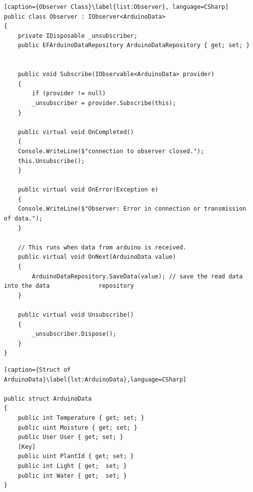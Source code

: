 \documentclass[a4paper,12pt,twoside,openright,titlepage]{book}
\begin{document}
\begin{lstlisting}[caption={Observer Class}\label{list:Observer}, language=CSharp]
public class Observer : IObserver<ArduinoData>
{
	private IDisposable _unsubscriber;
    public EFArduinoDataRepository ArduinoDataRepository { get; set; }

      
	public void Subscribe(IObservable<ArduinoData> provider)
    {
		if (provider != null)
        _unsubscriber = provider.Subscribe(this);
	}

	public virtual void OnCompleted()
	{
	Console.WriteLine($"connection to observer closed.");
	this.Unsubscribe();
	}

	public virtual void OnError(Exception e)
	{
	Console.WriteLine($"Observer: Error in connection or transmission of data.");
	}

	// This runs when data from arduino is received.
	public virtual void OnNext(ArduinoData value)
	{
		ArduinoDataRepository.SaveData(value); // save the read data into the data 				repository
	}

	public virtual void Unsubscribe()
	{
		_unsubscriber.Dispose();
	}
}

\end{lstlisting}
\begin{lstlisting}[caption={Struct of ArduinoData}\label{lst:ArduinoData},language=CSharp]

public struct ArduinoData
{
	public int Temperature { get; set; }
	public uint Moisture { get; set; }
	public User User { get; set; }
	[Key]
	public uint PlantId { get; set; }
	public int Light { get;  set; }
	public int Water { get;  set; }
}
\end{lstlisting}
\backmatter 
\cleardoublepage{}


\end{document}
